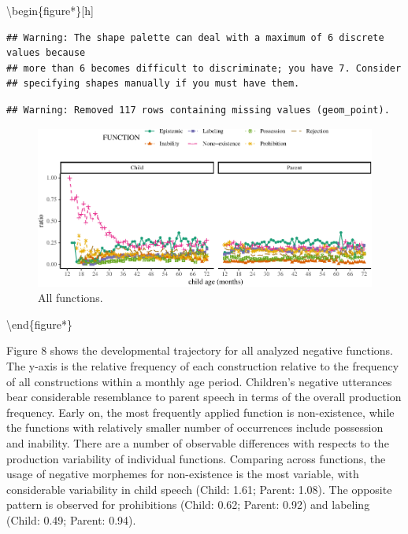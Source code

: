\documentclass[
  english,
  man,floatsintext]{apa6}
\begin{document}
\textbackslash begin\{figure*\}{[}h{]}

\begin{verbatim}
## Warning: The shape palette can deal with a maximum of 6 discrete values because
## more than 6 becomes difficult to discriminate; you have 7. Consider
## specifying shapes manually if you must have them.
\end{verbatim}

\begin{verbatim}
## Warning: Removed 117 rows containing missing values (geom_point).
\end{verbatim}

\begin{figure}[H]

{\centering \includegraphics{neg_combos_full_files/figure-latex/all-1} 

}

\caption{All functions.}\label{fig:all}
\end{figure}

\textbackslash end\{figure*\}

Figure 8 shows the developmental trajectory for all analyzed negative functions. The y-axis is the relative frequency of each construction relative to the frequency of all constructions within a monthly age period. Children's negative utterances bear considerable resemblance to parent speech in terms of the overall production frequency. Early on, the most frequently applied function is non-existence, while the functions with relatively smaller number of occurrences include possession and inability. There are a number of observable differences with respects to the production variability of individual functions. Comparing across functions, the usage of negative morphemes for non-existence is the most variable, with considerable variability in child speech (Child: 1.61; Parent: 1.08). The opposite pattern is observed for prohibitions (Child: 0.62; Parent: 0.92) and labeling (Child: 0.49; Parent: 0.94).
\end{document}
